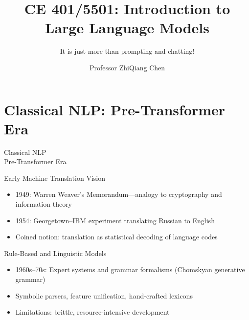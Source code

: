 \documentclass[german,10pt]{beamer}
\title{CE 401/5501: Introduction to Large Language Models}
\subtitle{It is just more than prompting and chatting!}
\author[]{Professor ZhiQiang Chen}
\institute[UMKC]{School of Science and Engineering \\ University of Missouri-Kansas City}
\date{}
\begin{document}
\begin{frame}
  \titlepage
\end{frame}


\section{Classical NLP: Pre-Transformer Era}

\begin{frame}[plain]
  \centering
  {\Huge Classical NLP}\vspace{0.5cm}\\
  {\Large Pre-Transformer Era}
\end{frame}

\begin{frame}{Early Machine Translation Vision}
  \begin{itemize}
    \item 1949: Warren Weaver’s Memorandum—analogy to cryptography and information theory
    \item 1954: Georgetown–IBM experiment translating Russian to English
    \item Coined notion: translation as statistical decoding of language codes
  \end{itemize}
\end{frame}

\begin{frame}{Rule-Based and Linguistic Models}
  \begin{itemize}
    \item 1960s–70s: Expert systems and grammar formalisms (Chomskyan generative grammar)
    \item Symbolic parsers, feature unification, hand-crafted lexicons
    \item Limitations: brittle, resource-intensive development
  \end{itemize}
\end{frame}
\end{document}
